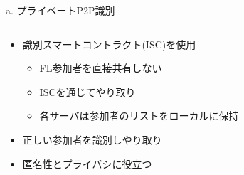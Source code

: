 \documentclass[unicode,12pt,aspectratio=169, dvipdfmx]{beamer}
\begin{document}
    \begin{frame}{a. プライベートP2P識別}
        \begin{columns}
            \begin{column}[T]{.7\linewidth}
                \begin{itemize}
                    \item 識別スマートコントラクト(ISC)を使用
                    \begin{itemize}
                        \item FL参加者を直接共有しない
                        \item ISCを通じてやり取り
                        \item 各サーバは参加者のリストをローカルに保持
                    \end{itemize}    
                    \item 正しい参加者を識別しやり取り
                    \item 匿名性とプライバシに役立つ
                \end{itemize}          
            \end{column}
        \end{columns}
    \end{frame}
\end{document}
